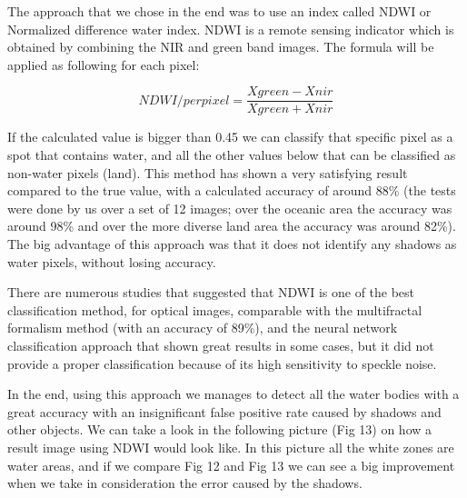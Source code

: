\documentclass[12pt, a4paper]{report}
\begin{document}
The approach that we chose in the end was to use an index called NDWI or Normalized difference water index. NDWI is a remote sensing indicator which is obtained by combining the NIR and green band images. The formula will be applied as following for each pixel:

$$ NDWI/perpixel = \frac{Xgreen - Xnir}{Xgreen + Xnir}$$

If the calculated value is bigger than 0.45 we can classify that specific pixel as a spot that contains water, and all the other values below that can be classified as non-water pixels (land). This method has shown a very satisfying result compared to the true value, with a calculated accuracy of around 88\% (the tests were done by us over a set of 12 images; over the oceanic area the accuracy was around 98\% and over the more diverse land area the accuracy was around 82\%). The big advantage of this approach was that it does not identify any shadows as water pixels, without losing accuracy. 
\par 
There are numerous studies \cite{NDWI, NDWI Comparison} that suggested that NDWI is one of the best classification method, for optical images, comparable with the multifractal formalism method (with an accuracy of 89\%), and the neural network classification approach that shown great results in some cases, but it did not provide a proper classification because of its high sensitivity to speckle noise.
\par 

In the end, using this approach we manages to detect all the water bodies with a great accuracy with an insignificant false positive rate caused by shadows and other objects. We can take a look in the following picture (Fig 13) on how a result image using NDWI would look like. In this picture all the white zones are water areas, and if we compare Fig 12 and Fig 13 we can see a big improvement when we take in consideration the error caused by the shadows.
\par 
\end{document}
